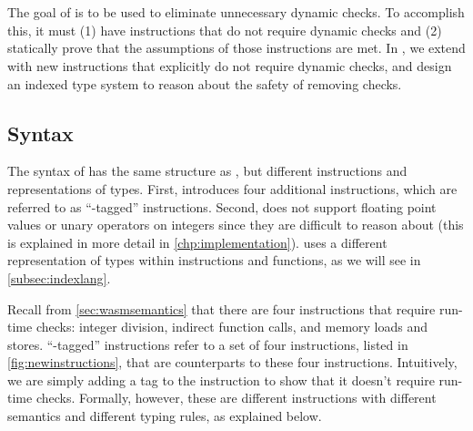 \chapter{\name}
\label{chp:prechk}
The goal of \name is to be used to eliminate unnecessary dynamic checks.
To accomplish this, it must (1) have instructions that do not require dynamic checks and (2) statically prove that the assumptions of those instructions are met.
In \name, we extend \wasm with new instructions that explicitly do not require dynamic checks, and design an indexed type system to reason about the safety of removing checks.

\section{\name Syntax}
The syntax of \name has the same structure as \wasm, but different instructions and representations of types.
First, \name introduces four additional instructions, which are referred to as ``\prechk-tagged'' instructions.
Second, \name does not support floating point values or unary operators on integers since they are difficult to reason about (this is explained in more detail in \autoref{chp:implementation}).
\name uses a different representation of types within instructions and functions, as we will see in \autoref{subsec:indexlang}.

Recall from \autoref{sec:wasmsemantics} that there are four \wasm instructions that require run-time checks: integer division, indirect function calls, and memory loads and stores.
``\prechk-tagged'' instructions refer to a set of four \name instructions, listed in \autoref{fig:newinstructions}, that are counterparts to these four \wasm instructions.
Intuitively, we are simply adding a tag to the instruction to show that it doesn't require run-time checks.
Formally, however, these are different instructions with different semantics and different typing rules, as explained below.

